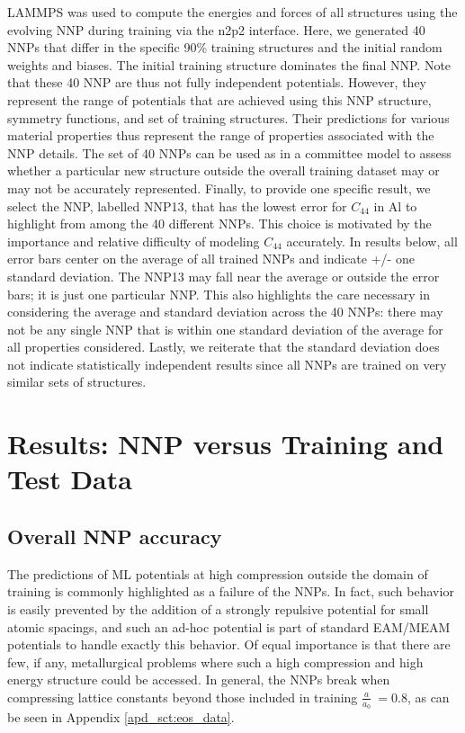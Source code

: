 \documentclass{article}
\begin{document}
LAMMPS\cite{Plimpton1995} was used to compute the energies and forces of all structures using the evolving NNP during training via the n2p2 interface. 
Here, we generated 40 NNPs that differ in the specific 90\% training structures and the initial random weights and biases.  The initial training structure dominates the final NNP.  Note that these 40 NNP are thus not fully independent potentials.  However, they represent the range of potentials that are achieved using this NNP structure, symmetry functions, and set of training structures.  Their predictions for various material properties thus represent the range of properties associated with the NNP details.  The set of 40 NNPs can be used as in a committee model to assess whether a particular new structure outside the overall training dataset may or may not be accurately represented.
Finally, to provide one specific result, we select the NNP, labelled NNP13, that has the lowest error for $C_{44}$ in Al to highlight from among the 40 different NNPs. This choice is motivated by  the importance and relative difficulty of modeling $C_{44}$ accurately.  In results below, all error bars center on the average of all trained NNPs and indicate +/- one standard deviation.  The NNP13 may fall near the average or outside the error bars; it is just one particular NNP.  This also highlights the care necessary in considering the average and standard deviation across the 40 NNPs: there may not be any single NNP that is within one standard deviation of the average for all properties considered.  Lastly, we reiterate that the standard deviation does not indicate statistically independent results since all NNPs are trained on very similar sets of structures.



\section{Results: NNP versus Training and Test Data}

\subsection{Overall NNP accuracy} \label{sct:test_and_train_errors}
The predictions of ML potentials at high compression outside the domain of training is commonly highlighted as a failure of the NNPs.
In fact, such behavior is easily prevented by the addition of a strongly repulsive potential for small atomic spacings, and such an ad-hoc potential is part of standard EAM/MEAM potentials to handle exactly this behavior.
Of equal importance is that there are few, if any, metallurgical problems where such a high compression and high energy structure could be accessed.
In general, the NNPs break when compressing lattice constants beyond those included in training $\frac{a}{a_0} ~= 0.8$, as can be seen in Appendix \ref{apd_sct:eos_data}. 
\end{document}
